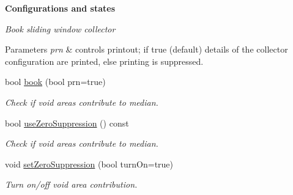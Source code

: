 \begin{Indent}{\bf Configurations and states}\par
{\em Book sliding window collector


\begin{DoxyParams}{Parameters}
{\em prn} & controls printout; if {\ttfamily true} (default) details of the collector configuration are printed, else printing is suppressed. \\
\hline
\end{DoxyParams}
}\begin{DoxyCompactItemize}
\item 
bool \hyperlink{classSlidingWindow_1_1Window_a553cfe27c9cc1b3c8830652aa3380cc3}{book} (bool prn=true)
\begin{DoxyCompactList}\small\item\em Check if void areas contribute to median. \end{DoxyCompactList}\item 
bool \hyperlink{classSlidingWindow_1_1Window_a1d2d499fbb6a6e7681c71df13e8f4a4c}{use\+Zero\+Suppression} () const 
\begin{DoxyCompactList}\small\item\em Check if void areas contribute to median. \end{DoxyCompactList}\item 
void \hyperlink{classSlidingWindow_1_1Window_a2d621b897887a5eaa7f8deda24ca8740}{set\+Zero\+Suppression} (bool turn\+On=true)
\begin{DoxyCompactList}\small\item\em Turn on/off void area contribution. \end{DoxyCompactList}\end{DoxyCompactItemize}
\end{Indent}
